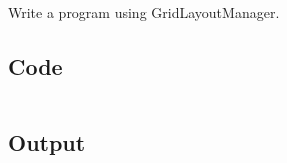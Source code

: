 \documentclass[../main.tex]{subfiles}
\begin{document}
Write a program using GridLayoutManager.

\subsection{Code}
\inputminted[frame=lines, breaklines, breakanywhere, numberblanklines=false]{java}{./programs/prog20/GridLay.java}

\subsection{Output}
\end{document}
